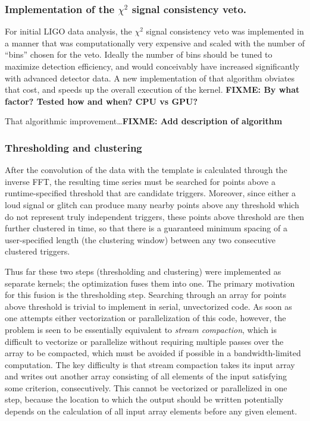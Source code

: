 \documentclass{article}
\begin{document}
\subsubsection{Implementation of the $\chi^2$ signal consistency veto.}
\label{sec:impl-chi2-sign}

For initial LIGO data analysis, the $\chi^2$ signal consistency veto was implemented
in a manner that was computationally very expensive and scaled with the number
of ``bins'' chosen for the veto.  Ideally the number of bins should be tuned to
maximize detection efficiency, and would conceivably have increased
significantly with advanced detector data.  A new implementation of that
algorithm obviates that cost, and speeds up the overall execution of the
kernel. \textbf{FIXME: By what factor? Tested how and when? CPU vs GPU?}

That algorithmic improvement\ldots\textbf{FIXME: Add description of algorithm}

\subsubsection{Thresholding and clustering}
\label{sec:thresh-clust}

After the convolution of the data
with the template is calculated through the inverse FFT, the resulting time
series must be searched for points above a runtime-specified threshold that are
candidate triggers.  Moreover, since either a loud signal or glitch can produce
many nearby points above any threshold which do not represent truly independent
triggers, these points above threshold are then further clustered in time, so
that there is a guaranteed minimum spacing of a user-specified length (the
clustering window) between any two consecutive clustered triggers.

Thus far these two steps (thresholding and clustering) were implemented as
separate kernels; the optimization fuses them into one.  The primary motivation
for this fusion is the thresholding step.  Searching through an array for points
above threshold is trivial to implement in serial, unvectorized code.  As soon
as one attempts either vectorization or parallelization of this code, however,
the problem is seen to be essentially equivalent to \emph{stream compaction},
which is difficult to vectorize or parallelize without requiring multiple passes
over the array to be compacted, which must be avoided if possible in a
bandwidth-limited computation.  The key difficulty is that stream compaction
takes its input array and writes out another array consisting of all elements of
the input satisfying some criterion, consecutively.  This cannot be vectorized
or parallelized in one step, because the location to which the output should be
written potentially depends on the calculation of all input array elements
before any given element. 
\end{document}

